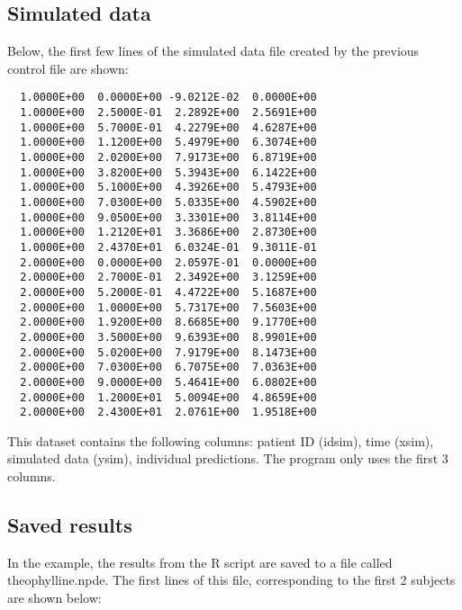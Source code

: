 \newpage
{}
\subsection*{Simulated data}\label{sec:appsimuldata}
\hskip 18pt Below, the first few lines of the simulated data file created by the
previous control file are shown:
{\small
\begin{verbatim}
  1.0000E+00  0.0000E+00 -9.0212E-02  0.0000E+00
  1.0000E+00  2.5000E-01  2.2892E+00  2.5691E+00
  1.0000E+00  5.7000E-01  4.2279E+00  4.6287E+00
  1.0000E+00  1.1200E+00  5.4979E+00  6.3074E+00
  1.0000E+00  2.0200E+00  7.9173E+00  6.8719E+00
  1.0000E+00  3.8200E+00  5.3943E+00  6.1422E+00
  1.0000E+00  5.1000E+00  4.3926E+00  5.4793E+00
  1.0000E+00  7.0300E+00  5.0335E+00  4.5902E+00
  1.0000E+00  9.0500E+00  3.3301E+00  3.8114E+00
  1.0000E+00  1.2120E+01  3.3686E+00  2.8730E+00
  1.0000E+00  2.4370E+01  6.0324E-01  9.3011E-01
  2.0000E+00  0.0000E+00  2.0597E-01  0.0000E+00
  2.0000E+00  2.7000E-01  2.3492E+00  3.1259E+00
  2.0000E+00  5.2000E-01  4.4722E+00  5.1687E+00
  2.0000E+00  1.0000E+00  5.7317E+00  7.5603E+00
  2.0000E+00  1.9200E+00  8.6685E+00  9.1770E+00
  2.0000E+00  3.5000E+00  9.6393E+00  8.9901E+00
  2.0000E+00  5.0200E+00  7.9179E+00  8.1473E+00
  2.0000E+00  7.0300E+00  6.7075E+00  7.0363E+00
  2.0000E+00  9.0000E+00  5.4641E+00  6.0802E+00
  2.0000E+00  1.2000E+01  5.0094E+00  4.8659E+00
  2.0000E+00  2.4300E+01  2.0761E+00  1.9518E+00
\end{verbatim}
}

This dataset contains the following columns: patient ID (idsim), time (xsim),
simulated data (ysim), individual predictions. The program only uses the first 3
columns.
		
\newpage
{}
\subsection*{Saved results}\label{sec:savedres}

\hskip 18pt In the example, the results from the R script are saved to a file called {\sf
theophylline.npde}. The first lines of this file, corresponding to the first 2
subjects are shown below: \\

